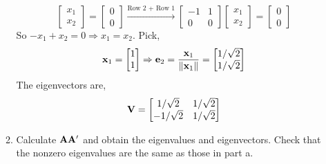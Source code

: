 \begin{enumerate}[font=\bfseries]
\begin{enumerate}
\[\begin{bmatrix}
                    x_1 \\
                    x_2
                \end{bmatrix}
                =
                \begin{bmatrix}
                    0 \\
                    0
                \end{bmatrix}
                \overset{\text{Row 2 + Row 1}}{\longrightarrow}
                \begin{bmatrix}
                    -1 & 1 \\
                    0 & 0
                \end{bmatrix}
                \begin{bmatrix}
                    x_1 \\
                    x_2
                \end{bmatrix}
                =
                \begin{bmatrix}
                    0 \\
                    0
                \end{bmatrix}
            \]
            So $-x_1 + x_2 = 0 \Rightarrow x_1 = x_2$. Pick,
            \[
                \bold{x}_1
                =
                \begin{bmatrix}
                    1 \\
                    1
                \end{bmatrix}
                \Rightarrow
                \bold{e}_2
                =
                \frac{\bold{x}_1}{\left\|\bold{x}_1\right\|}
                =
                \begin{bmatrix}
                    1/\sqrt{2} \\
                    1/\sqrt{2}
                \end{bmatrix}
            \]
            The eigenvectors are,
            \[
                \bold{V}
                =
                \begin{bmatrix}
                    1/\sqrt{2} & 1/\sqrt{2} \\
                    -1/\sqrt{2} & 1/\sqrt{2}
                \end{bmatrix}
            \]
            \item Calculate $\bold{A}\bold{A}^\prime$ and obtain the eigenvalues and eigenvectors. Check that the nonzero eigenvalues are the same as those in part a.
            \par

\end{enumerate}
\end{enumerate}
